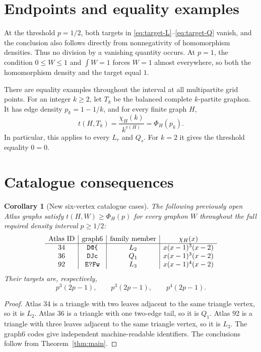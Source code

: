 \documentclass[11pt]{article}
\newtheorem{corollary}[theorem]{Corollary}
\begin{document}
\section{Endpoints and equality examples}

At the threshold $p=1/2$, both targets in
\eqref{eq:target-L}--\eqref{eq:target-Q} vanish, and the conclusion also
follows directly from nonnegativity of homomorphism densities.  Thus no
division by a vanishing quantity occurs.  At $p=1$, the condition
$0\leq W\leq1$ and $\int W=1$ forces $W=1$ almost everywhere, so both the
homomorphism density and the target equal $1$.

There are equality examples throughout the interval at all multipartite
grid points.  For an integer $k\geq2$, let $T_k$ be the balanced complete
$k$-partite graphon.  It has edge density $p_k=1-1/k$, and for every finite
graph $H$,
\[
t(H,T_k)=\frac{\chi_H(k)}{k^{v(H)}}=\Phi_H(p_k).
\]
In particular, this applies to every $L_r$ and $Q_s$.  For $k=2$ it gives
the threshold equality $0=0$.


\section{Catalogue consequences}

\begin{corollary}[New six-vertex catalogue cases]
\label{cor:atlas}
The following previously open Atlas graphs satisfy
$t(H,W)\geq\Phi_H(p)$ for every graphon $W$ throughout the full required
density interval $p\geq1/2$:
\[
\begin{array}{c|c|c|c}
\text{Atlas ID}&\text{graph6}&\text{family member}&\chi_H(x)\\
\hline
34&\texttt{D@\char123}&L_2&x(x-1)^3(x-2)\\
36&\texttt{DJc}&Q_1&x(x-1)^3(x-2)\\
92&\texttt{E?Fw}&L_3&x(x-1)^4(x-2)
\end{array}
\]
Their targets are, respectively,
\[
p^3(2p-1),\qquad p^3(2p-1),\qquad p^4(2p-1).
\]
\end{corollary}

\begin{proof}
Atlas 34 is a triangle with two leaves adjacent to the same triangle
vertex, so it is $L_2$.  Atlas 36 is a triangle with one two-edge tail,
so it is $Q_1$.  Atlas 92 is a triangle with three leaves adjacent to the
same triangle vertex, so it is $L_3$.  The graph6 codes give independent
machine-readable identifiers.  The conclusions follow from
Theorem~\ref{thm:main}.
\end{proof}
\end{document}

